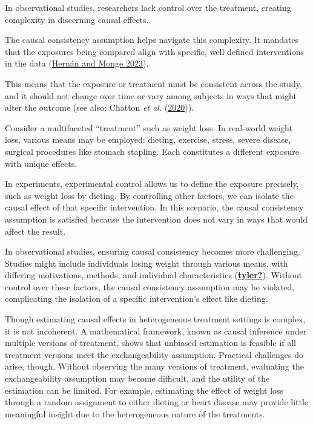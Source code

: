 \documentclass[
  singlecolumn]{article}
\begin{document}
In observational studies, researchers lack control over the treatment,
creating complexity in discerning causal effects.

The causal consistency assumption helps navigate this complexity. It
mandates that the exposures being compared align with specific,
well-defined interventions in the data
(\hyperref[ref-hernuxe1n2023]{Hernán and Monge 2023}).

This means that the exposure or treatment must be consistent across the
study, and it should not change over time or vary among subjects in ways
that might alter the outcome (see also: Chatton \emph{et al.}
(\hyperref[ref-chatton2020]{2020})).

Consider a multifaceted ``treatment'' such as weight loss. In real-world
weight loss, various means may be employed: dieting, exercise, stress,
severe disease, surgical procedures like stomach stapling. Each
constitutes a different exposure with unique effects.

In experiments, experimental control allows us to define the exposure
precisely, such as weight loss by dieting. By controlling other factors,
we can isolate the causal effect of that specific intervention. In this
scenario, the causal consistency assumption is satisfied because the
intervention does not vary in ways that would affect the result.

In observational studies, ensuring causal consistency becomes more
challenging. Studies might include individuals losing weight through
various means, with differing motivations, methods, and individual
characteristics (\hyperref[ref-tyler]{\textbf{tyler?}}). Without control
over these factors, the causal consistency assumption may be violated,
complicating the isolation of a specific intervention's effect like
dieting.

Though estimating causal effects in heterogeneous treatment settings is
complex, it is not incoherent. A mathematical framework, known as causal
inference under multiple versions of treatment, shows that unbiased
estimation is feasible if all treatment versions meet the
exchangeability assumption. Practical challenges do arise, though.
Without observing the many versions of treatment, evaluating the
exchangeability assumption may become difficult, and the utility of the
estimation can be limited. For example, estimating the effect of weight
loss through a random assignment to either dieting or heart disease may
provide little meaningful insight due to the heterogeneous nature of the
treatments.
\end{document}
